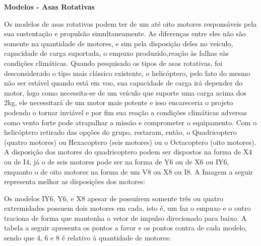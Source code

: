 
\textbf{Modelos - Asas Rotativas}

Os modelos de asas rotativas podem ter de um até oito motores responsáveis pela sua sustentação e propulsão simultaneamente. As diferenças entre eles não são somente na quantidade de motores, e sim pela disposição deles no veículo, capacidade de carga suportada, o empuxo produzido,reação às falhas eàs condições climáticas.
Quando pesquisado os tipos de asas rotativas, foi desconsiderado o tipo mais clássico existente, o helicóptero, pelo fato do mesmo não ser estável quando está em voo, sua capacidade de carga irá depender do motor, logo como necessita-se de um veículo que suporte uma carga acima dos 2kg, ele necessitará de um motor mais potente e isso encareceria o projeto podendo o tornar inviável e por fim sua reação a condições climáticas adversas como vento forte pode atrapalhar a missão e comprometer o equipamento.
Com o helicóptero retirado das opções do grupo, restaram, então, o Quadricoptero (quatro motores) ou Hexacoptero (seis motores) ou o Octacoptero (oito motores). A disposição dos motores do quadricoptero podem ser dispostos na forma de X4 ou de I4, já o de seis motores pode ser na forma de Y6 ou de X6 ou IY6, enquanto o de oito motores na forma de um V8 ou X8 ou I8. A Imagem a seguir representa melhor as disposições dos motores:

Os modelos IY6, Y6, e X8 apesar de possuírem somente três ou quatro extremidades possuem dois motores em cada, isto é, um faz o empuxo e o outro traciona de forma que mantenha o vetor de impulso direcionado para baixo. A tabela a seguir apresenta os pontos a favor e os pontos contra de cada modelo, sendo que 4, 6 e 8 é relativo à quantidade de motores:

